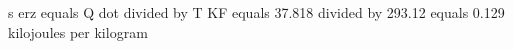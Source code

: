 s erz equals Q dot divided by T KF  
equals 37.818 divided by 293.12  
equals 0.129 kilojoules per kilogram